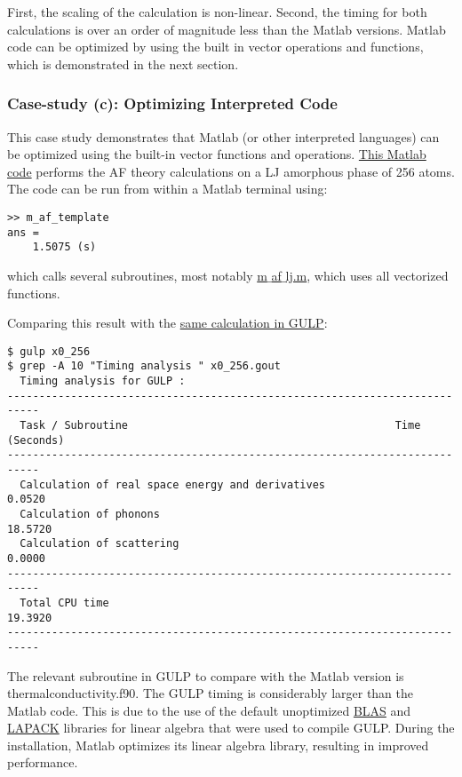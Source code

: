 First, the scaling of the calculation is non-linear. Second, the timing for 
both calculations is over an order of magnitude less than the Matlab versions. 
Matlab code can be optimized by using the built in vector operations and 
functions, which is demonstrated in the next section.

\subsubsection{\label{A:coding_lang:case3}
Case-study (c): Optimizing Interpreted Code}

This case study demonstrates that Matlab (or other interpreted languages) 
can be optimized using the built-in vector functions and operations. 
\href{https://github.com/jasonlarkin/disorder/blob/master/matlab/m_af_template.m}
{This Matlab code} performs the AF theory calculations 
on a LJ amorphous phase of 256 atoms. The code can be run from within 
a Matlab terminal using:
\begin{lstlisting}
>> m_af_template
ans =
    1.5075 (s)
\end{lstlisting}
which calls several subroutines, most notably 
\href{https://github.com/jasonlarkin/disorder/blob/master/matlab/m_af_lj.m}{m$\_$af$\_$lj.m}, 
which uses all vectorized functions. 

Comparing this result with the 
\href{https://github.com/jasonlarkin/disorder/blob/master/matlab/gulp/x0_256.gin}
{same calculation in GULP}:
\begin{lstlisting}
$ gulp x0_256
$ grep -A 10 "Timing analysis " x0_256.gout
  Timing analysis for GULP :
---------------------------------------------------------------------------
  Task / Subroutine                                          Time (Seconds)
---------------------------------------------------------------------------
  Calculation of real space energy and derivatives                0.0520
  Calculation of phonons                                         18.5720
  Calculation of scattering                                       0.0000
---------------------------------------------------------------------------
  Total CPU time                                                 19.3920
---------------------------------------------------------------------------
\end{lstlisting}
The relevant subroutine in GULP to compare with the Matlab version is 
thermalconductivity.f90. 
The GULP timing is considerably larger than the Matlab code.  This is 
due to the use of the default unoptimized 
\href{http://www.netlib.org/blas/}{BLAS} and 
\href{http://www.netlib.org/lapack/}{LAPACK} libraries 
for linear algebra that were used to compile GULP. During the installation, 
Matlab optimizes its linear algebra library, resulting 
in improved performance. 

